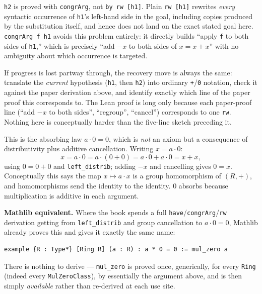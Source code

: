\texttt{h2} is proved with \texttt{congrArg}, not \texttt{by rw [h1]}. Plain \texttt{rw [h1]} rewrites \emph{every} syntactic occurrence of \texttt{h1}'s left-hand side in the goal, including copies produced by the substitution itself, and hence does not land on the exact stated goal here. \texttt{congrArg f h1} avoids this problem entirely: it directly builds ``apply \texttt{f} to both sides of \texttt{h1},'' which is precisely ``add \(-x\) to both sides of \(x = x+x\)'' with no ambiguity about which occurrence is targeted.

If progress is lost partway through, the recovery move is always the same: translate the \emph{current} hypothesis (\texttt{h1}, then \texttt{h2}) into ordinary \texttt{+}/\texttt{0} notation, check it against the paper derivation above, and identify exactly which line of the paper proof this corresponds to. The Lean proof is long only because each paper-proof line (``add \(-x\) to both sides'', ``regroup'', ``cancel'') corresponds to one \texttt{rw}. Nothing here is conceptually harder than the five-line sketch preceding it.

\begin{mathreading}

This is the absorbing law \(a\cdot 0 = 0\), which is \emph{not} an axiom but a consequence of distributivity plus additive cancellation. Writing \(x = a\cdot 0\): \[
x = a\cdot 0 = a\cdot(0+0) = a\cdot 0 + a\cdot 0 = x + x,
\] using \(0 = 0+0\) and \texttt{left\_\allowbreak{}distrib}; adding \(-x\) and cancelling gives \(0 = x\). Conceptually this says the map \(x \mapsto a\cdot x\) is a group homomorphism of \((R,+)\), and homomorphisms send the identity to the identity. \(0\) absorbs because multiplication is additive in each argument.

\end{mathreading}

\textbf{Mathlib equivalent.} Where the book spends a full \texttt{have}/\texttt{congrArg}/\texttt{rw} derivation getting from \texttt{left\_\allowbreak{}distrib} and group cancellation to \(a\cdot 0=0\), Mathlib already proves this and gives it exactly the same name:

\begin{lstlisting}
example {R : Type*} [Ring R] (a : R) : a * 0 = 0 := mul_zero a
\end{lstlisting}

There is nothing to derive --- \texttt{mul\_\allowbreak{}zero} is proved once, generically, for every \texttt{Ring} (indeed every \texttt{MulZeroClass}), by essentially the argument above, and is then simply \emph{available} rather than re-derived at each use site.
